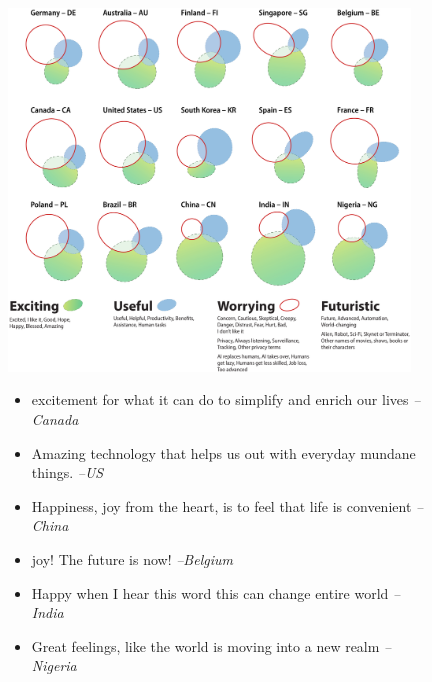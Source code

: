 \documentclass[11pt]{article} %
\newcommand\aff[1]{\textcolor{darkplum}{{\emph{--#1}}}}
\newenvironment{lq1}
{ \begin{itemize}[leftmargin = 0em, label={}]
    \fontsize{8pt}{8.6pt}\selectfont
    \setlength{\itemsep}{2pt}
    \setlength{\parskip}{2pt}
    \setlength{\parsep}{2pt}       }
{ \end{itemize}                    }
\def\Exciting/{{\fontfamily{lmss}\selectfont\textbf{Exciting}}}  \def\Useful/{{\fontfamily{lmss}\selectfont\textbf{Useful}}}
\begin{document}
\begin{figure}[p]
\centering
\vspace{-0.7cm}
  \includegraphics[width=0.95\textwidth]{figs/Rplot09.pdf}
\vspace{-0.3cm}
\setlength\columnsep{12pt}
\begin{multicols}{4}


\begin{lq1}
\item excitement for what it can do to simplify and enrich our lives \aff{Canada}
\item Amazing technology that helps us out with everyday mundane things. \aff{US}
\item Happiness, joy from the heart, is to feel that life is convenient \aff{China}
\item joy! The future is now! \aff{Belgium}
\item Happy when I hear this word this can change entire world \aff{India}
\item Great feelings, like the world is moving into a new realm \aff{Nigeria}
\end{lq1}

\columnbreak


\end{multicols}
\end{figure}
\end{document}
